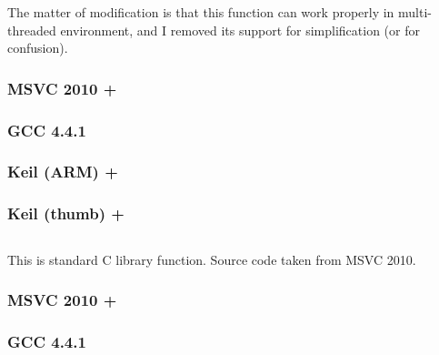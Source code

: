 {The matter of modification is that this function can work properly in multi-threaded environment,
and I removed its support for simplification (or for confusion).}

\subsubsection{MSVC 2010 + \Ox}



\subsubsection{GCC 4.4.1}



\subsubsection{Keil (ARM) + \Othree}



\subsubsection{Keil (thumb) + \Othree}



\subsection{}

{This is standard C library function. Source code taken from MSVC 2010.}

\subsubsection{MSVC 2010 + \Ox}



\subsubsection{GCC 4.4.1}



